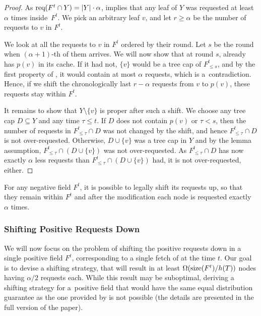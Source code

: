 \begin{proof}
As $\textrm{req}(F^t \cap Y) = |Y| \cdot \alpha$, 
implies that any leaf of $Y$ was requested at least $\alpha$ times
inside~$F^t$. We pick an arbitrary leaf $v$, and let $r \geq \alpha$ be the
number of requests to $v$ in $F^t$.

We look at all the requests to $v$ in $F^t$ ordered by their round. Let $s$ be
the round when $(\alpha+1)$-th of them arrives. We will now show that at round
$s$, \ALGTC already has $p(v)$ in its cache. If it had not, $\{v\}$ would be a
tree cap of $F^t_{\leq s}$, and by the first property of
, it would contain at most $\alpha$
requests, which is a~contradiction. Hence, if we shift the chronologically
last $r - \alpha$ requests from $v$ to $p(v)$, these requests stay within
$F^t$.

It remains to show that $Y \setminus \{v\}$ is proper after such a shift. We
choose any tree cap $D \subseteq Y$ and any time \mbox{$\tau \leq t$}. If $D$
does not contain $p(v)$ or $\tau < s$, then the number of requests in
$F^t_{\leq \tau} \cap D$ was not changed by the shift, and hence $F^t_{\leq
\tau} \cap D$ is not over-requested. Otherwise, $D \cup \{v\}$ was a tree cap
in $Y$ and by the lemma assumption, $F^t_{\leq \tau} \cap (D \cup \{v\})$ was
not over-requested. As $F^t_{\leq \tau} \cap D$ has now exactly $\alpha$ less
requests than $F^t_{\leq \tau} \cap (D \cup \{v\})$ had, it is not
over-requested, either.
\end{proof}

\begin{corollary}
\label{cor:crucial_lemma_neg}
For any negative field $F^t$, it is possible to legally shift its requests up,
so that they remain within $F^t$ and after the modification each node is
requested exactly $\alpha$ times.
\end{corollary}



\subsubsection{Shifting Positive Requests Down}
\label{sec:positive_shifting}

We will now focus on the problem of shifting the positive requests down in a
single positive field $F^t$, corresponding to a single fetch of \ALGTC at the
time $t$. Our goal is to devise a shifting strategy, that will result in at
least $\Omega(\textrm{size}(F^t)/h(T))$ nodes having $\alpha/2$ requests each. While
this result may be suboptimal, deriving a shifting strategy for a~positive
field that would have the same equal distribution guarantee as the one
provided by  is not possible 
(the details are presented in the full version of the paper).


